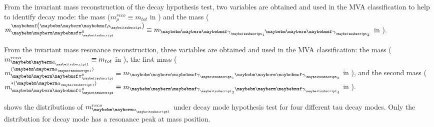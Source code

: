 



From  the \Prho invariant mass reconstruction of the \decayRhoShort  decay hypothesis test,  two variables are  obtained and  used in the MVA classification to help to identify  \decayRhoShort  decay mode: the \Prho mass ($m^{reco}_\rho \equiv m_{tot}$ in ) and the \Ppizero mass ($m_{\Pgpz}^{\parenths{\Prho}} \equiv m_{\Pphoton_1\Pphoton_2}$ in  ).

From the \Pai invariant mass resonance reconstruction, three variables are obtained and used in the MVA classification:  the \Pai mass ($m^{reco}_{\Pai} \equiv m_{tot}$ in ), the first \Ppizero mass ($m_{\Pgpz}^{(\Pai)} \equiv m_{\Pphoton_1\Pphoton_2}$ in ), and the second \Ppizero mass ($m^{*(\Pai)}_{\Pgpz} \equiv  m_{\Pphoton_3\Pphoton_4}$ in ).

  shows the distributions of  $m^{reco}_{\Pai}$ under \decayAiPhotonShort decay mode hypothesis test for four different tau decay modes. Only the distribution for \decayAiPhotonShort decay mode has a resonance peak at \Pai mass position.


